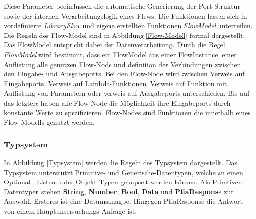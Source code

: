     Diese Parameter beeinflussen die automatische Generierung der Port-Struktur sowie der internen Verarbeitungslogik eines Flows. \cite{99}
    Die Funktionen lassen sich in vordefinierte \textit{LibraryFlow} und eigene erstellten Funktionen \textit{FlowModel} unterteilen.\\
    Die Regeln des Flow-Model sind in Abbildung \ref{Flow-Modell} formal dargestellt. Das FlowModel entspricht dabei der Datenverarbeitung. \cite{99}
    Durch die Regel \textit{FlowModel} wird bestimmt, dass ein FlowModel aus einer FlowInstance, einer Auflistung alle genutzen Flow-Node und definition der Verbindungen zwischen den Eingabe- und Ausgabeports.
    Bei den Flow-Node wird zwischen Verweis auf Eingabeports, Verweis auf Lambda-Funktionen, Verweis auf Funktion mit Auflistung von Parametern oder verweis auf Ausgabeports unterschieden.
    Bis auf das letztere haben alle Flow-Node die Möglichkeit ihre Eingabeports durch konstante Werte zu spezifizieren.
    Flow-Nodes sind Funktionen die innerhalb eines Flow-Modells genutzt werden.\\
    \subsubsection{Typsystem}
    In Abbildung \ref{Typsystem} werden die Regeln des Typsystem dargestellt.
    Das Typsystem unterstützt Primitive- und Generische-Datentypen, welche an einen Optional-, Listen- oder Objekt-Typen gekapselt werden können.
    Als Primtiven-Datentypen stehen \textbf{String}, \textbf{Number}, \textbf{Bool}, \textbf{Data} und \textbf{PtiaResponse} zur Auswahl.
    Ersteres ist eine Datumsanagbe. Hingegen PtiaResponse die Antwort von einem Hauptunsersuchungs-Anfrage ist.\\
